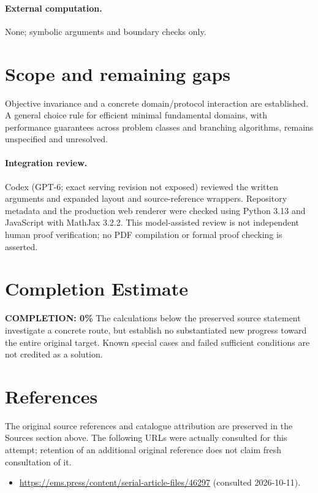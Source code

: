 \documentclass[11pt]{article}
\begin{document}
\paragraph{External computation.} None; symbolic arguments and boundary checks only.
\section{Scope and remaining gaps}
Objective invariance and a concrete domain/protocol interaction are established. A general choice rule for efficient minimal fundamental domains, with performance guarantees across problem classes and branching algorithms, remains unspecified and unresolved.
\paragraph{Integration review.} Codex (GPT-6; exact serving revision not exposed) reviewed the written arguments and expanded layout and source-reference wrappers. Repository metadata and the production web renderer were checked using Python 3.13 and JavaScript with MathJax 3.2.2. This model-assisted review is not independent human proof verification; no PDF compilation or formal proof checking is asserted.

\section{Completion Estimate}
\noindent\textbf{COMPLETION: 0\%}
The calculations below the preserved source statement investigate a concrete route,
but establish no substantiated new progress toward the entire original target.
Known special cases and failed sufficient conditions are not credited as a solution.
\section{References}
The original source references and catalogue attribution are preserved in the
Sources section above. The following URLs were actually consulted for this attempt;
retention of an additional original reference does not claim fresh consultation of it.
\begin{itemize}
\item \url{https://ems.press/content/serial-article-files/46297} (consulted 2026-10-11). 
\end{itemize}
\end{document}
